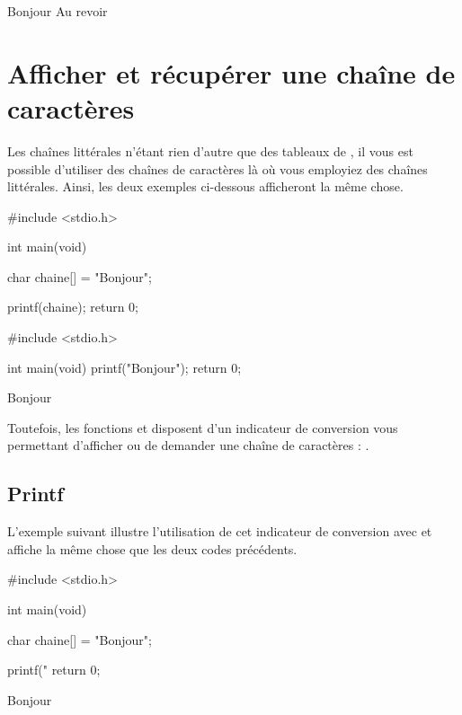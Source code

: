 \begin{C}
Bonjour
Au revoir
\end{C}


\section{Afficher et récupérer une chaîne de caractères}
\label{afficher-etrecuperer-une-chaine-de-caracteres}

Les chaînes littérales n'étant rien
d'autre que des tableaux de , il vous est possible
d'utiliser des chaînes de caractères là où vous employiez des chaînes
littérales. Ainsi, les deux exemples ci-dessous afficheront la même
chose.

\begin{C}
#include <stdio.h>


int main(void)
{
    char chaine[] = "Bonjour\n";

    printf(chaine);
    return 0;
}
\end{C}

\begin{C}
#include <stdio.h>


int main(void)
{
    printf("Bonjour\n");
    return 0;
}
\end{C}

\begin{C}
Bonjour
\end{C}

Toutefois, les fonctions  et  disposent
d'un indicateur de conversion vous permettant d'afficher ou de demander
une chaîne de caractères : .

\subsection{Printf}
\label{printf}

L'exemple suivant illustre l'utilisation de cet indicateur de conversion
avec  et affiche la même chose que les deux codes
précédents.

\begin{C}
#include <stdio.h>


int main(void)
{
    char chaine[] = "Bonjour";

    printf("%
    return 0;
}
\end{C}

\begin{C}
Bonjour
\end{C}

